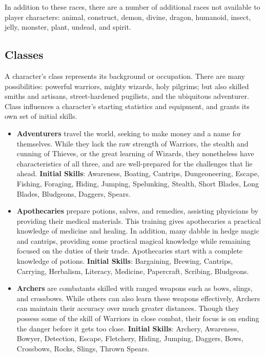 In addition to these races, there are a number of additional races not
available to player characters: animal, construct, demon, divine, dragon,
humanoid, insect, jelly, monster, plant, undead, and spirit.

\subsection{Classes}

A character's class represents its background or occupation.  There are
many possibilities: powerful warriors, mighty wizards, holy pilgrims; but
also skilled smiths and artisans, street-hardened pugilists, and the
ubiquitous adventurer.  Class influences a character's starting statistics
and equipment, and grants its own set of initial skills.

\begin{itemize}
\item {\bf Adventurers} travel the world, seeking to make money and a name 
for themselves.  While they lack the raw strength of Warriors, the stealth 
and cunning of Thieves, or the great learning of Wizards, they nonetheless 
have characteristics of all three, and are well-prepared for the challenges
that lie ahead.  \textbf{Initial Skills}: Awareness, Boating, 
Cantrips, Dungeoneering, Escape, Fishing, Foraging, Hiding, Jumping, 
Spelunking, Stealth, Short Blades, Long Blades, Bludgeons, Daggers, Spears.

\item {\bf Apothecaries} prepare potions, salves, and remedies, assisting 
physicians by providing their medical materials.  This training gives 
apothecaries a practical knowledge of medicine and healing.  In addition, 
many dabble in hedge magic and cantrips, providing some practical magical 
knowledge while remaining focused on the duties of their trade.
Apothecaries start with a complete knowledge of potions.
\textbf{Initial Skills}: Bargaining, Brewing, Cantrips, Carrying,
Herbalism, Literacy, Medicine, Papercraft, Scribing, Bludgeons.

\item {\bf Archers} are combatants skilled with ranged weapons such as 
bows, slings, and crossbows.  While others can also learn these weapons 
effectively, Archers can maintain their accuracy over much greater 
distances.  Though they possess some of the skill of Warriors in close 
combat, their focus is on ending the danger before it gets too close.  
\textbf{Initial Skills}: Archery, Awareness, Bowyer, Detection, Escape,
Fletchery, Hiding, Jumping, Daggers, Bows, Crossbows, Rocks, Slings,
Thrown Spears.


\end{itemize}
